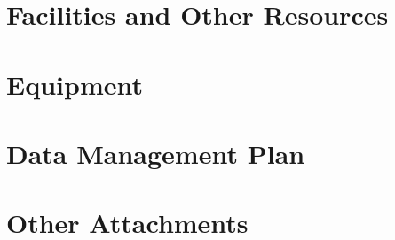 \documentclass[11pt]{article}
\begin{document}
\thispagestyle{empty}
\AddToShipoutPicture*{\BackgroundPic}


\clearpage
{}

\thispagestyle{fancy}
\setlength{\headheight}{19.7478pt}
\setlength{\headsep}{4pt}
\newlength{\nsfoffset}
\setlength{\nsfoffset}{\headheight}
\addtolength{\nsfoffset}{\baselineskip}



\appendix




\clearpage




\clearpage


\clearpage

\section{Facilities and Other Resources}\label{sec:facilities}


\section{Equipment}\label{sec:equipment}


\section{Data Management Plan}\label{sec:dataplan}


\section{Other Attachments}\label{sec:other}

\end{document}

